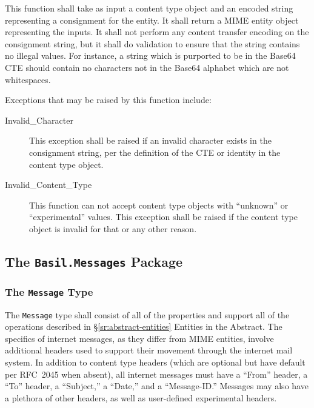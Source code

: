 \documentclass[11pt]{article}
\begin{document}
This function shall take as input a content type object and an encoded
string representing a consignment for the entity. It shall return a
MIME entity object representing the inputs. It shall not perform any
content transfer encoding on the consignment string, but it shall do
validation to ensure that the string contains no illegal values. For
instance, a string which is purported to be in the Base64 CTE should
contain no characters not in the Base64 alphabet which are not
whitespaces.

Exceptions that may be raised by this function include:

\begin{description}

\item[Invalid\_Character] This exception shall be raised if an invalid
  character exists in the consignment string, per the definition of
  the CTE or identity in the content type object.

\item[Invalid\_Content\_Type] This function can not accept content
  type objects with ``unknown'' or ``experimental'' values. This
  exception shall be raised if the content type object is invalid for
  that or any other reason.

\end{description}



\subsection{The \texttt{Basil.Messages} Package}
\label{sr:messages}

\subsubsection{The \texttt{Message} Type}
\label{sr:messages:message}

The \texttt{Message} type shall consist of all of the properties and
support all of the operations described in
\S\ref{sr:abstract-entities} Entities in the Abstract. The specifics
of internet messages, as they differ from MIME entities, involve
additional headers used to support their movement through the internet
mail system. In addition to content type headers (which are optional
but have default per RFC~2045 when absent), all internet messages must
have a ``From'' header, a ``To'' header, a ``Subject,'' a ``Date,''
and a ``Message-ID.'' Messages may also have a plethora of other
headers, as well as user-defined experimental headers.
\end{document}
